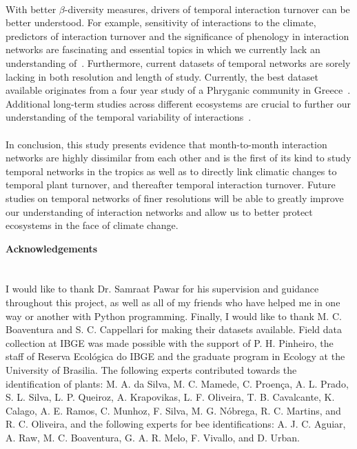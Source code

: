 \documentclass[11pt]{article}
\begin{document}
\\
With better $\beta$-diversity measures, drivers of temporal interaction turnover can be better understood. For example, sensitivity of interactions to the climate, predictors of interaction turnover and the significance of phenology in interaction networks are fascinating and essential topics in which we currently lack an understanding of~\citep{Poisot2012}. Furthermore, current datasets of temporal networks are sorely lacking in both resolution and length of study. Currently, the best dataset available originates from a four year study of a Phryganic community in Greece~\citep{Petanidou1991}. 
Additional long-term studies across different ecosystems are crucial to further our understanding of the temporal variability of interactions~\citep{Burkle2011}.\\
\\
In conclusion, this study presents evidence that month-to-month interaction networks are highly dissimilar from each other and is the first of its kind to study temporal networks in the tropics as well as to directly link climatic changes to temporal plant turnover, and thereafter temporal interaction turnover. Future studies on temporal networks of finer resolutions will be able to greatly improve our understanding of interaction networks and allow us to better protect ecosystems in the face of climate change.

\newpage 
\vspace*{\fill}

{\huge\bfseries Acknowledgements} \label{sec: acknowledgements} \\
\\
\\
\large{I would like to thank Dr. Samraat Pawar for his supervision and guidance throughout this project, as well as  all of my friends who have helped me in one way or another with Python programming. Finally, I would like to thank M. C. Boaventura and S. C. Cappellari for making their datasets available. Field data collection at IBGE was made possible with the support of P. H. Pinheiro, the staff of Reserva Ecol\'{o}gica do IBGE and the graduate program in Ecology at the University of Brasilia. The following experts contributed towards the identification of plants: M. A. da Silva, M. C. Mamede, C. Proen\c{c}a, A. L. Prado, S. L. Silva, L. P. Queiroz, A. Krapovikas, L. F. Oliveira, T. B. Cavalcante, K. Calago, A. E. Ramos, C. Munhoz, F. Silva, M. G. N\'{o}brega, R. C. Martins, and R. C. Oliveira, and the following experts for bee identifications: A. J. C. Aguiar, A. Raw, M. C. Boaventura, G. A. R. Melo, F. Vivallo, and D. Urban.}
\vfill
\end{document}
